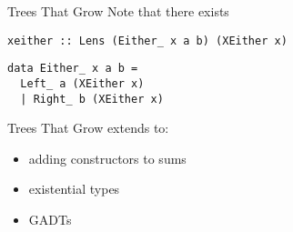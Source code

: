 \begin{frame}[fragile]
\begin{block}{Trees That Grow}
Note that there exists
\begin{lstlisting}[style=haskell]
xeither :: Lens (Either_ x a b) (XEither x)
\end{lstlisting}
\begin{lstlisting}[style=haskell]
data Either_ x a b =
  Left_ a (XEither x)
  | Right_ b (XEither x)
\end{lstlisting}
\end{block}
\end{frame}

\begin{frame}[fragile]
\begin{center}
Trees That Grow extends to:\cite{najd2016trees}
\begin{itemize}
\item adding constructors to sums
\item existential types
\item GADTs
\end{itemize}
\end{center}
\end{frame}
